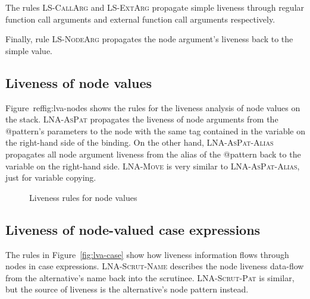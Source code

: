 \documentclass[main.tex]{subfiles}
\begin{document}
	The rules \textsc{LS-CallArg} and \textsc{LS-ExtArg} propagate simple liveness through regular function call arguments and external function call arguments respectively.
	
	Finally, rule \textsc{LS-NodeArg} propagates the node argument's liveness back to the simple value.
	
	\subsection{Liveness of node values}
	
	Figure~ref{fig:lva-nodes} shows the rules for the liveness analysis of node values on the stack. \textsc{LNA-AsPat} propagates the liveness of node arguments from the @pattern's parameters to the node with the same tag contained in the variable on the right-hand side of the binding. On the other hand, \textsc{LNA-AsPat-Alias} propagates all node argument liveness from the alias of the @pattern back to the variable on the right-hand side. \textsc{LNA-Move} is very similar to \textsc{LNA-AsPat-Alias}, just for variable copying.

  \begin{figure}[h]
  \caption{Liveness rules for node values}
  \label{fig:lva-nodes}
  \end{figure}

	\subsection{Liveness of node-valued case expressions}
	
	The rules in Figure~\ref{fig:lva-case} show how liveness information flows through nodes in case expressions. \textsc{LNA-Scrut-Name} describes the node liveness data-flow from the alternative's name back into the scrutinee. \textsc{LNA-Scrut-Pat} is similar, but the source of liveness is the alternative's node pattern instead.
	
\end{document}

